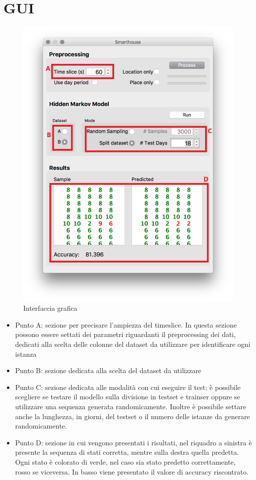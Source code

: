\documentclass[10pt,a4paper]{article}
\begin{document}
	
	\section{GUI}
	
	\begin{figure}[!htbp]
	\includegraphics[width=\linewidth]{immagini/gui.png}
	\caption{Interfaccia grafica}
	\label{fig:b_3ks}
	\end{figure}
	\begin{itemize}
	    \item Punto A: sezione per precisare l'ampiezza del timeslice. In questa sezione possono essere settati dei parametri riguardanti il preprocessing dei dati, dedicati alla scelta delle colonne del dataset da utilizzare per identificare ogni istanza
	    \item Punto B: sezione dedicata alla scelta del dataset da utilizzare 
	    \item Punto C: sezione dedicata alle modalità con cui eseguire il test; è possibile scegliere se testare il modello sulla divisione in testset e trainser oppure se utilizzare una sequenza generata randomicamente. Inoltre è possibile settare anche la lunghezza, in giorni, del testset o il numero delle istanze da generare randomicamente.
	    \item Punto D: sezione in cui vengono presentati i risultati, nel riquadro a sinistra è presente la sequenza di stati corretta, mentre sulla destra quella predetta. Ogni stato è colorato di verde, nel caso sia stato predetto correttamente, rosso se viceversa. In basso viene presentato il valore di accuracy riscontrato.
	\end{itemize}
	
\end{document}
